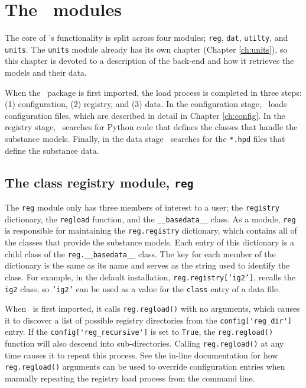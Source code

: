 \chapter{The \PM\ modules}

The core of \PM's functionality is split across four modules; \texttt{reg}, \texttt{dat}, \texttt{utilty}, and \texttt{units}.  The \texttt{units} module already has its own chapter (Chapter \ref{ch:units}), so this chapter is devoted to a description of the back-end and how it retrieves the models and their data.

When the \PM\ package is first imported, the load process is completed in three steps: (1) configuration, (2) registry, and (3) data.  In the configuration stage, \PM\ loads configuration files, which are described in detail in Chapter \ref{ch:config}.  In the registry stage, \PM\ searches for Python code that defines the classes that handle the substance models.  Finally, in the data stage \PM\ searches for the \texttt{*.hpd} files that define the substance data. 

\section{The class registry module, \texttt{reg}}

The \texttt{reg} module only has three members of interest to a user; the \texttt{registry} dictionary, the \texttt{regload} function, and the \verb|__basedata__| class.  As a module, \texttt{reg} is responsible for maintaining the \texttt{reg.registry} dictionary, which contains all of the classes that provide the substance models.  Each entry of this dictionary is a child class of the \verb|reg.__basedata__| class.  The key for each member of the dictionary is the same as its name and serves as the string used to identify the class.  For example, in the default installation, \texttt{reg.registry['ig2']}, recalls the \texttt{ig2} class, so \texttt{'ig2'} can be used as a value for the \texttt{class} entry of a data file.

When \PM\ is first imported, it calls \texttt{reg.regload()} with no arguments, which causes it to discover a list of possible registry directories from the \verb|config['reg_dir']| entry.  If the \verb|config['reg_recursive']| is set to \texttt{True}, the \texttt{reg.regload()} function will also descend into sub-directories.  Calling \texttt{reg.regload()} at any time causes it to repeat this process.  See the in-line documentation for how \texttt{reg.regload()} arguments can be used to override configuration entries when manually repeating the registry load process from the command line.

